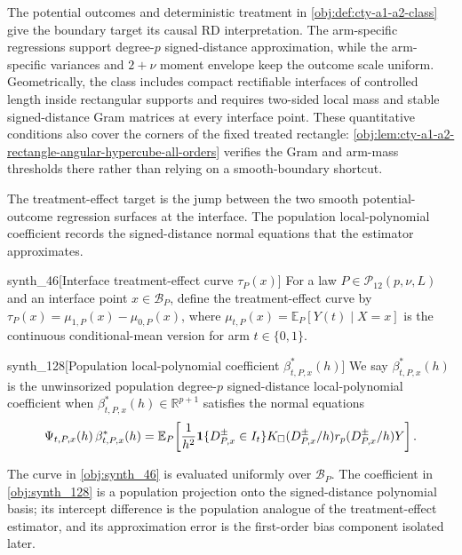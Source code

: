 \documentclass[11pt]{article}
\begin{document}
The potential outcomes  and deterministic treatment  in \cref{obj:def:cty-a1-a2-class} give the boundary target its causal RD interpretation. The arm-specific regressions  support degree-\(p\) signed-distance approximation, while the arm-specific variances  and \(2+\nu\) moment envelope keep the outcome scale uniform. Geometrically, the class includes compact rectifiable interfaces of controlled length inside rectangular supports and requires two-sided local mass and stable signed-distance Gram matrices at every interface point. These quantitative conditions also cover the corners of the fixed treated rectangle: \cref{obj:lem:cty-a1-a2-rectangle-angular-hypercube-all-orders} verifies the Gram and arm-mass thresholds there rather than relying on a smooth-boundary shortcut.

The treatment-effect target is the jump between the two smooth potential-outcome regression surfaces at the interface. The population local-polynomial coefficient records the signed-distance normal equations that the estimator approximates.

\begin{definitionv}{synth_46}[Interface treatment-effect curve $\tau_P(x)$]
For a law $P\in\mathcal P_{12}(p,\nu,L)$ and an interface point $x\in\mathcal B_P$, define the treatment-effect curve by $\tau_P(x)=\mu_{1,P}(x)-\mu_{0,P}(x)$, where $\mu_{t,P}(x)=\mathbb E_P[Y(t)\mid X=x]$ is the continuous conditional-mean version for arm $t\in\{0,1\}$.
\end{definitionv}

\begin{definitionv}{synth_128}[Population local-polynomial coefficient $\beta^*_{t,P,x}(h)$]
We say $\beta^*_{t,P,x}(h)$ is the unwinsorized population degree-$p$ signed-distance local-polynomial coefficient when $\beta^*_{t,P,x}(h)\in\mathbb R^{p+1}$ satisfies the normal equations \[\Psi_{t,P,x}(h)\,\beta^*_{t,P,x}(h)=\mathbb E_P\!\left[{1\over h^2}\mathbf 1\{D^{\pm}_{P,x}\in I_t\}K_\square(D^{\pm}_{P,x}/h)r_p(D^{\pm}_{P,x}/h)Y\right].\]
\end{definitionv}

The curve  in \cref{obj:synth_46} is evaluated uniformly over \(\mathcal B_P\). The coefficient in \cref{obj:synth_128} is a population projection onto the signed-distance polynomial basis; its intercept difference is the population analogue of the treatment-effect estimator, and its approximation error is the first-order bias component isolated later.
\end{document}
